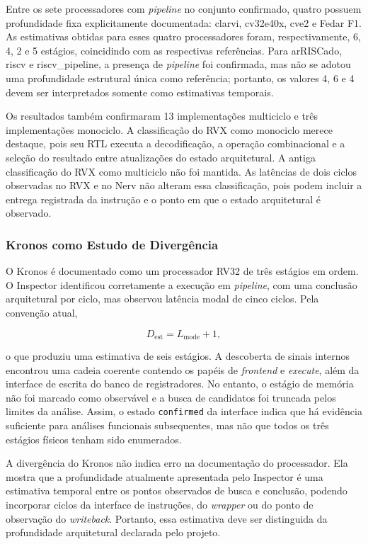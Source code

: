 Entre os sete processadores com \textit{pipeline} no conjunto confirmado,
quatro possuem profundidade fixa explicitamente documentada: clarvi, cv32e40x,
cve2 e Fedar F1. As estimativas obtidas para esses quatro processadores foram,
respectivamente, 6, 4, 2 e 5 estágios, coincidindo com as respectivas
referências. Para arRISCado, riscv e riscv\_pipeline, a presença de
\textit{pipeline} foi confirmada, mas não se adotou uma profundidade estrutural
única como referência; portanto, os valores 4, 6 e 4 devem ser interpretados
somente como estimativas temporais.

Os resultados também confirmaram 13 implementações multiciclo e três
implementações monociclo. A classificação do RVX como monociclo merece
destaque, pois seu RTL executa a decodificação, a operação combinacional e a
seleção do resultado entre atualizações do estado arquitetural. A antiga
classificação do RVX como multiciclo não foi mantida. As latências de dois
ciclos observadas no RVX e no Nerv não alteram essa classificação, pois podem
incluir a entrega registrada da instrução e o ponto em que o estado
arquitetural é observado.

\subsubsection{Kronos como Estudo de Divergência}

O Kronos é documentado como um processador RV32 de três estágios em ordem. O
Inspector identificou corretamente a execução em \textit{pipeline}, com uma
conclusão arquitetural por ciclo, mas observou latência modal de cinco ciclos.
Pela convenção atual,

\begin{equation}
    D_{\mathrm{est}} = L_{\mathrm{mode}} + 1,
\end{equation}

o que produziu uma estimativa de seis estágios. A descoberta de sinais internos
encontrou uma cadeia coerente contendo os papéis de \textit{frontend} e
\textit{execute}, além da interface de escrita do banco de registradores. No
entanto, o estágio de memória não foi marcado como observável e a busca de
candidatos foi truncada pelos limites da análise. Assim, o estado
\texttt{confirmed} da interface indica que há evidência suficiente para
análises funcionais subsequentes, mas não que todos os três estágios físicos
tenham sido enumerados.

A divergência do Kronos não indica erro na documentação do processador. Ela
mostra que a profundidade atualmente apresentada pelo Inspector é uma
estimativa temporal entre os pontos observados de busca e conclusão, podendo
incorporar ciclos da interface de instruções, do \textit{wrapper} ou do ponto
de observação do \textit{writeback}. Portanto, essa estimativa deve ser
distinguida da profundidade arquitetural declarada pelo projeto.

